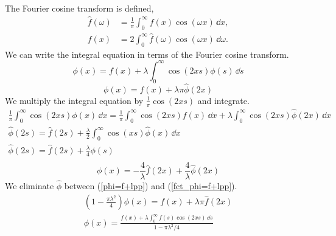 \begin{Solution}
  The Fourier cosine transform is defined,
  \begin{align*}
    \hat{f}(\omega) &= \frac{1}{\pi} \int_0^\infty f(x) \cos(\omega x) \,\dd x, \\
    f(x) &= 2 \int_0^\infty \hat{f}(\omega) \cos(\omega x) \,\dd \omega. 
  \end{align*}
  We can write the integral equation in terms of the Fourier cosine transform.
  \[
  \phi(x) = f(x) + \lambda \int_0^\infty \cos(2 x s) \phi(s) \,\dd s
  \]
  \begin{equation}
    \label{phi=f+lpp}
    \phi(x) = f(x) + \lambda \pi \hat{\phi}(2 x)
  \end{equation}
  We multiply the integral equation by $\frac{1}{\pi} \cos(2 x s)$ and integrate.
  \begin{gather*}
    \frac{1}{\pi} \int_0^\infty \cos(2 x s) \phi(x)\,\dd x 
    = \frac{1}{\pi} \int_0^\infty \cos(2 x s) f(x)\,\dd x 
    + \lambda \int_0^\infty \cos(2 x s) \hat{\phi}(2 x)\,\dd x \\
    \hat{\phi}(2 s) = \hat{f}(2 s)  
    + \frac{ \lambda }{ 2 } \int_0^\infty \cos(x s) \hat{\phi}(x)\,\dd x \\
    \hat{\phi}(2 s) = \hat{f}(2 s) + \frac{ \lambda }{ 4 } \phi(s) \\
  \end{gather*}
  \begin{equation}
    \label{fct_phi=f+lpp}
    \phi(x) = - \frac{4}{\lambda} \hat{f}(2 x) + \frac{4}{\lambda} \hat{\phi}(2 x)
  \end{equation}
  We eliminate $\hat{\phi}$ between (\ref{phi=f+lpp}) and (\ref{fct_phi=f+lpp}).
  \begin{gather*}
    \left( 1 - \frac{\pi \lambda^2}{4} \right) \phi(x) 
    = f(x) + \lambda \pi \hat{f}(2 x) \\
    \boxed{
      \phi(x) = \frac{ f(x) + \lambda \int_0^\infty f(s) \cos(2 x s) \,\dd s }
      { 1 - \pi \lambda^2 / 4 }
      }
  \end{gather*}
\end{Solution}



